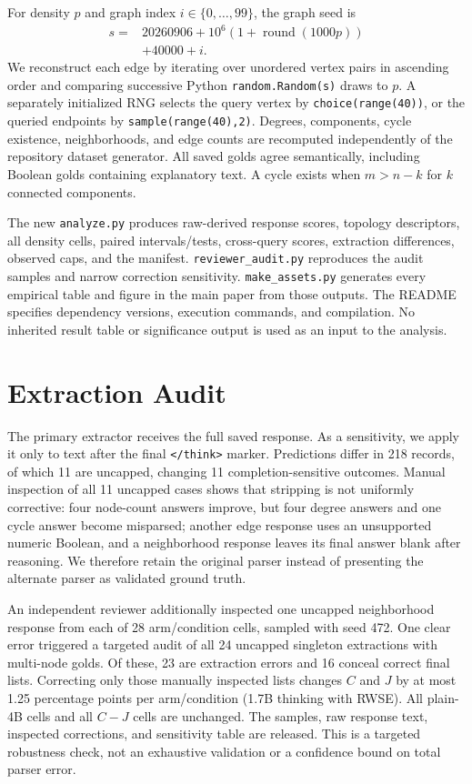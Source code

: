 \documentclass[11pt]{article}
\begin{document}
For density $p$ and graph index $i\in\{0,\ldots,99\}$, the graph seed is
\begin{align*}
 s={}&20260906+10^6(1+\operatorname{round}(1000p))\\
 &+40000+i.
\end{align*}
We reconstruct each edge by iterating over unordered vertex pairs in ascending order and comparing successive Python \texttt{random.Random(s)} draws to $p$. A separately initialized RNG selects the query vertex by \texttt{choice(range(40))}, or the queried endpoints by \texttt{sample(range(40),2)}. Degrees, components, cycle existence, neighborhoods, and edge counts are recomputed independently of the repository dataset generator. All saved golds agree semantically, including Boolean golds containing explanatory text. A cycle exists when $m>n-k$ for $k$ connected components.

The new \texttt{analyze.py} produces raw-derived response scores, topology descriptors, all density cells, paired intervals/tests, cross-query scores, extraction differences, observed caps, and the manifest. \texttt{reviewer\_audit.py} reproduces the audit samples and narrow correction sensitivity. \texttt{make\_assets.py} generates every empirical table and figure in the main paper from those outputs. The README specifies dependency versions, execution commands, and compilation. No inherited result table or significance output is used as an input to the analysis.

\section{Extraction Audit}\label{app:parser}
The primary extractor receives the full saved response. As a sensitivity, we apply it only to text after the final \texttt{</think>} marker. Predictions differ in 218 records, of which 11 are uncapped, changing 11 completion-sensitive outcomes. Manual inspection of all 11 uncapped cases shows that stripping is not uniformly corrective: four node-count answers improve, but four degree answers and one cycle answer become misparsed; another edge response uses an unsupported numeric Boolean, and a neighborhood response leaves its final answer blank after reasoning. We therefore retain the original parser instead of presenting the alternate parser as validated ground truth.

An independent reviewer additionally inspected one uncapped neighborhood response from each of 28 arm/condition cells, sampled with seed 472. One clear error triggered a targeted audit of all 24 uncapped singleton extractions with multi-node golds. Of these, 23 are extraction errors and 16 conceal correct final lists. Correcting only those manually inspected lists changes $C$ and $J$ by at most 1.25 percentage points per arm/condition (1.7B thinking with RWSE). All plain-4B cells and all $C-J$ cells are unchanged. The samples, raw response text, inspected corrections, and sensitivity table are released. This is a targeted robustness check, not an exhaustive validation or a confidence bound on total parser error.
\end{document}
